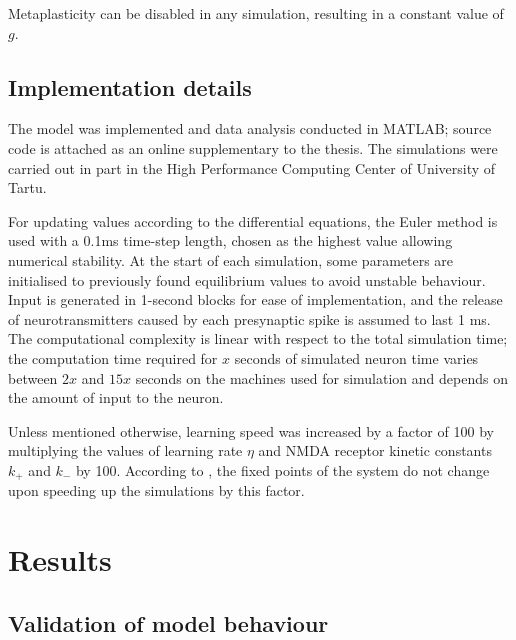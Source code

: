 \documentclass[a4paper,12pt]{report}
\theoremstyle{definition}
\begin{document}
Metaplasticity can be disabled in any simulation, resulting in a constant value of $g$.





\section{Implementation details}

The model was implemented and data analysis conducted in MATLAB; source code is attached as an online supplementary to the thesis. The simulations were carried out in part in the High Performance Computing Center of University of Tartu.

For updating values according to the differential equations, the Euler method is used with a 0.1ms time-step length, chosen as the highest value allowing numerical stability. At the start of each simulation, some parameters are initialised to previously found equilibrium values to avoid unstable behaviour. Input is generated in 1-second blocks for ease of implementation, and the release of neurotransmitters caused by each presynaptic spike is assumed to last 1 ms. The computational complexity is linear with respect to the total simulation time; the computation time required for $x$ seconds of simulated neuron time varies between $2x$ and $15x$ seconds on the machines used for simulation and depends on the amount of input to the neuron.

Unless mentioned otherwise, learning speed was increased by a factor of 100 by multiplying the values of learning rate $\eta$ and NMDA receptor kinetic constants $k_+$ and $k_-$ by 100. According to \cite{yeung2004synaptic}, the fixed points of the system do not change upon speeding up the simulations by this factor.











\chapter{Results}

\section{Validation of model behaviour}
\end{document}
